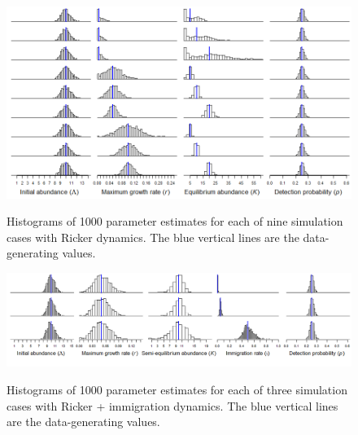 \documentclass{article}
\begin{document}
\clearpage


\begin{figure}
\caption{Histograms of 1000 parameter estimates for each of nine
simulation cases with Ricker dynamics. The blue vertical lines are the 
data-generating values.}
  \centering
  \includegraphics{../figs/rick_hists}
\label{fig:rick_hists}
\end{figure}

\begin{figure}
\caption{Histograms of 1000 parameter estimates for each of three
simulation cases with Ricker + immigration dynamics. The blue vertical lines are the 
data-generating values.}
  \centering
  \includegraphics[width=8.5in]{../figs/ricki_hists}
\label{fig:ricki_hists}
\end{figure}
\end{document}
